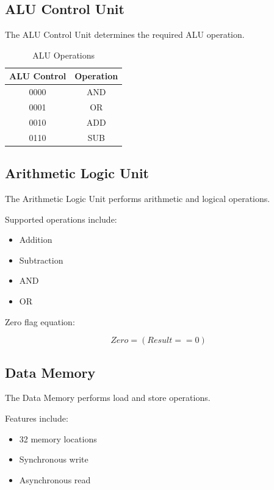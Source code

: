 \documentclass[conference]{IEEEtran}
\begin{document}
\subsection{ALU Control Unit}

The ALU Control Unit determines the required ALU operation.

\begin{table}[H]
\caption{ALU Operations}
\centering
\begin{tabular}{|c|c|}
\hline
ALU Control & Operation \\
\hline
0000 & AND \\
0001 & OR \\
0010 & ADD \\
0110 & SUB \\
\hline
\end{tabular}
\end{table}


\subsection{Arithmetic Logic Unit}

The Arithmetic Logic Unit performs arithmetic and logical operations.

Supported operations include:

\begin{itemize}
    \item Addition
    \item Subtraction
    \item AND
    \item OR
\end{itemize}

Zero flag equation:

\[
Zero = (Result == 0)
\]


\subsection{Data Memory}

The Data Memory performs load and store operations.

Features include:

\begin{itemize}
    \item 32 memory locations
    \item Synchronous write
    \item Asynchronous read
\end{itemize}
\end{document}
